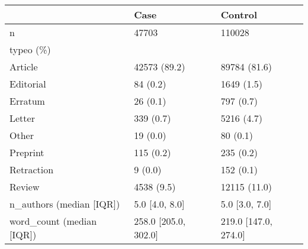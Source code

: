 
\begin{tabular}{l|l|l}
\hline
  & Case & Control\\
\hline
n & 47703 & 110028\\
\hline
typeo (\%) &  & \\
\hline
Article & 42573 (89.2) & 89784 (81.6)\\
\hline
Editorial & 84 (0.2) & 1649 (1.5)\\
\hline
Erratum & 26 (0.1) & 797 (0.7)\\
\hline
Letter & 339 (0.7) & 5216 (4.7)\\
\hline
Other & 19 (0.0) & 80 (0.1)\\
\hline
Preprint & 115 (0.2) & 235 (0.2)\\
\hline
Retraction & 9 (0.0) & 152 (0.1)\\
\hline
Review & 4538 (9.5) & 12115 (11.0)\\
\hline
n\_authors (median [IQR]) & 5.0 [4.0, 8.0] & 5.0 [3.0, 7.0]\\
\hline
word\_count (median [IQR]) & 258.0 [205.0, 302.0] & 219.0 [147.0, 274.0]\\
\hline
\end{tabular}